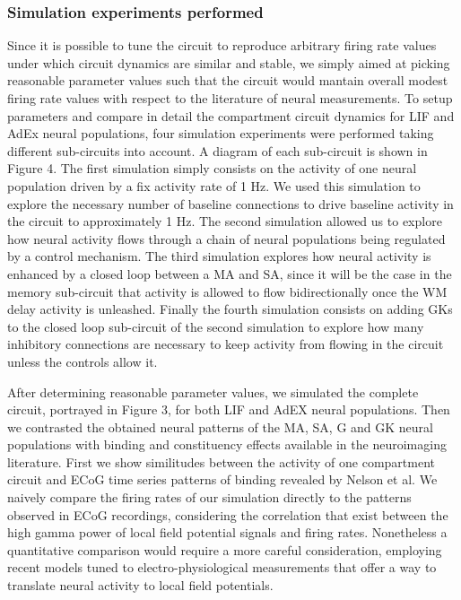 \documentclass[10pt]{article}
\begin{document}
\subsubsection{Simulation experiments
  performed}\label{simulation-experiments-performed}

Since it is possible to tune the circuit to reproduce arbitrary firing
rate values under which circuit dynamics are similar and stable, we
simply aimed at picking reasonable parameter values such that the
circuit would mantain overall modest firing rate values with respect
to the literature of neural measurements. To setup parameters and
compare in detail the compartment circuit dynamics for LIF and AdEx
neural populations, four simulation experiments were performed taking
different sub-circuits into account. A diagram of each sub-circuit is
shown in Figure 4. The first simulation simply consists on the
activity of one neural population driven by a fix activity rate of 1
Hz. We used this simulation to explore the necessary number of
baseline connections to drive baseline activity in the circuit to
approximately 1 Hz. The second simulation allowed us to explore how
neural activity flows through a chain of neural populations being
regulated by a control mechanism. The third simulation explores how
neural activity is enhanced by a closed loop between a MA and SA,
since it will be the case in the memory sub-circuit that activity is
allowed to flow bidirectionally once the WM delay activity is
unleashed. Finally the fourth simulation consists on adding GKs to the
closed loop sub-circuit of the second simulation to explore how many
inhibitory connections are necessary to keep activity from flowing in
the circuit unless the controls allow it.

After determining reasonable parameter values, we simulated the
complete circuit, portrayed in Figure 3, for both LIF and AdEX neural
populations. Then we contrasted the obtained neural patterns of the
MA, SA, G and GK neural populations with binding and constituency
effects available in the neuroimaging literature. First we show
similitudes between the activity of one compartment circuit and ECoG
time series patterns of binding revealed by Nelson et
al\cite{Nelson_2017}. We naively compare the firing rates of our
simulation directly to the patterns observed in ECoG recordings,
considering the correlation that exist between the high gamma power of
local field potential signals and firing
rates\cite{Ray_2011,Manning_2009}. Nonetheless a quantitative
comparison would require a more careful consideration, employing
recent models tuned to electro-physiological measurements that offer a
way to translate neural activity to local field
potentials\cite{Mazzoni_2015,Hagen_2015}.
\end{document}
